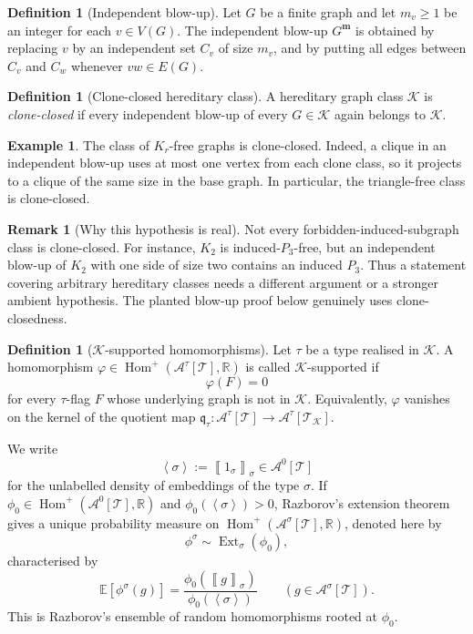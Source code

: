 \documentclass[11pt]{article}
\theoremstyle{definition}
\newtheorem{definition}[theorem]{Definition}
\newtheorem{example}[theorem]{Example}
\newtheorem{remark}[theorem]{Remark}
\newcommand{\R}{\mathbb{R}}
\newcommand{\E}{\mathbb{E}}
\newcommand{\A}{\mathcal{A}}
\newcommand{\K}{\mathcal{K}}
\newcommand{\T}{\mathcal{T}}
\newcommand{\Homp}{\operatorname{Hom}^{+}}
\newcommand{\Ext}{\operatorname{Ext}}
\newcommand{\brak}[1]{\left\langle #1\right\rangle}
\newcommand{\avg}[2]{\left\llbracket #1 \right\rrbracket_{#2}}
\newcommand{\q}{\mathfrak q}
\begin{document}
\begin{definition}[Independent blow-up]
Let $G$ be a finite graph and let $m_v\ge1$ be an integer for each
$v\in V(G)$.  The independent blow-up $G^{\mathbf m}$ is obtained by replacing
$v$ by an independent set $C_v$ of size $m_v$, and by putting all edges between
$C_v$ and $C_w$ whenever $vw\in E(G)$.
\end{definition}

\begin{definition}[Clone-closed hereditary class]
A hereditary graph class $\K$ is \emph{clone-closed} if every independent
blow-up of every $G\in\K$ again belongs to $\K$.
\end{definition}

\begin{example}
The class of $K_r$-free graphs is clone-closed.  Indeed, a clique in an
independent blow-up uses at most one vertex from each clone class, so it
projects to a clique of the same size in the base graph.  In particular, the
triangle-free class is clone-closed.
\end{example}

\begin{remark}[Why this hypothesis is real]
Not every forbidden-induced-subgraph class is clone-closed.  For instance,
$K_2$ is induced-$P_3$-free, but an independent blow-up of $K_2$ with one side
of size two contains an induced $P_3$.  Thus a statement covering arbitrary
hereditary classes needs a different argument or a stronger ambient hypothesis.
The planted blow-up proof below genuinely uses clone-closedness.
\end{remark}

\begin{definition}[$\K$-supported homomorphisms]
Let $\tau$ be a type realised in $\K$.  A homomorphism
$\varphi\in\Homp(\A^\tau[\T],\R)$ is called $\K$-supported if
\[
  \varphi(F)=0
\]
for every $\tau$-flag $F$ whose underlying graph is not in $\K$.
Equivalently, $\varphi$ vanishes on the kernel of the quotient map
$\q_\tau:\A^\tau[\T]\to\A^\tau[\T_\K]$.
\end{definition}

We write
\[
  \brak{\sigma}:=\avg{1_\sigma}{\sigma}\in\A^0[\T]
\]
for the unlabelled density of embeddings of the type $\sigma$.  If
$\phi_0\in\Homp(\A^0[\T],\R)$ and $\phi_0(\brak\sigma)>0$, Razborov's extension
theorem gives a unique probability measure on $\Homp(\A^\sigma[\T],\R)$,
denoted here by
\[
  \phi^\sigma\sim \Ext_\sigma(\phi_0),
\]
characterised by
\begin{equation}\label{eq:extension-expectation}
  \E[\phi^\sigma(g)]
  =
  \frac{\phi_0(\avg{g}{\sigma})}{\phi_0(\brak\sigma)}
  \qquad (g\in\A^\sigma[\T]).
\end{equation}
This is Razborov's ensemble of random homomorphisms rooted at $\phi_0$.
\end{document}
